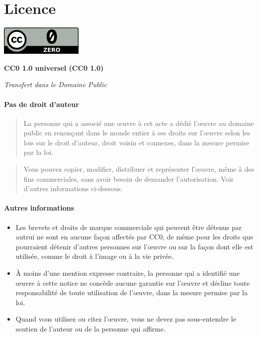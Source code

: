 
\section*{Licence}

\begin{center}
  \includegraphics[scale=0.5]{cczero}

  \textbf{CC0 1.0 universel (CC0 1.0)}

  \textit{Transfert dans le Domaine Public}
\end{center}



\paragraph{Pas de droit d’auteur}

  \begin{quote}
    La  personne  qui  a  associé  une œuvre  à  cet  acte  a  dédié
    l’œuvre au  domaine public en  renonçant dans le monde  entier à
    ses droits  sur l’œuvre  selon les lois  sur le  droit d’auteur,
    droit voisin et connexes, dans la mesure permise par la loi.
  \end{quote}

  \begin{quote}
    Vous pouvez copier, modifier,  distribuer et représenter l’œuvre,
    même  à  des  fins  commerciales, sans  avoir  besoin  de  demander
    l’autorisation. Voir d’autres informations ci-dessous.
  \end{quote}

\paragraph{Autres informations}

  \begin{itemize}
    \item Les brevets et droits de marque commerciale qui peuvent être 
      détenus par autrui ne sont en aucune façon affectés par CC0, de 
      même pour les droits que pourraient détenir d’autres personnes sur 
      l’œuvre ou sur la façon dont elle est utilisée, comme le droit à 
      l’image ou à la vie privée.
    \item À moins d’une mention expresse contraire, la personne qui a 
      identifié une œuvre à cette notice ne concède aucune garantie sur 
      l’œuvre et décline toute responsabilité de toute utilisation de 
      l’œuvre, dans la mesure permise par la loi.
    \item Quand vous utilisez ou citez l’œuvre, vous ne devez pas 
      sous-entendre le soutien de l’auteur ou de la personne qui affirme.
  \end{itemize}

